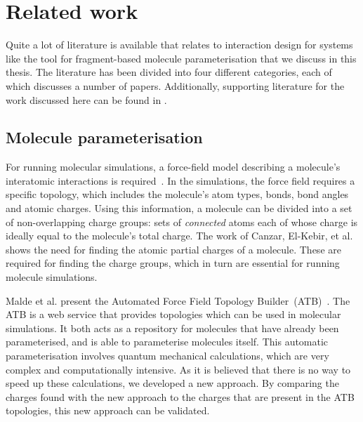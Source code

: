 \chapter{Related work}

Quite a lot of literature is available that relates to interaction design for systems like the tool for fragment-based molecule parameterisation that we discuss in this thesis. The literature has been divided into four different categories, each of which discusses a number of papers. Additionally, supporting literature for the work discussed here can be found in .



\section{Molecule parameterisation}
For running molecular simulations, a force-field model describing a molecule's interatomic interactions is required~\cite{canzar2012charge}. In the simulations, the force field requires a specific topology, which includes the molecule's atom types, bonds, bond angles and atomic charges. Using this information, a molecule can be divided into a set of non-overlapping charge groups: sets of \emph{connected} atoms each of whose charge is ideally equal to the molecule's total charge. The work of Canzar, El-Kebir, et al. shows the need for finding the atomic partial charges of a molecule. These are required for finding the charge groups, which in turn are essential for running molecule simulations.

Malde et al. present the Automated Force Field Topology Builder~(ATB)~\cite{malde2011automated}. The ATB is a web service that provides topologies which can be used in molecular simulations. It both acts as a repository for molecules that have already been parameterised, and is able to parameterise molecules itself. This automatic parameterisation involves quantum mechanical calculations, which are very complex and computationally intensive. As it is believed that there is no way to speed up these calculations, we developed a new approach. By comparing the charges found with the new approach to the charges that are present in the ATB topologies, this new approach can be validated.



